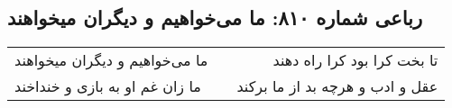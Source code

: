 \begin{center}
\section*{رباعی شماره ۸۱۰: ما می‌خواهیم و دیگران میخواهند}
\label{sec:0810}
\begin{longtable}{l p{0.5cm} r}
ما می‌خواهیم و دیگران میخواهند
&&
تا بخت کرا بود کرا راه دهند
\\
ما زان غم او به بازی و خنداخند
&&
عقل و ادب و هرچه بد از ما برکند
\\
\end{longtable}
\end{center}
